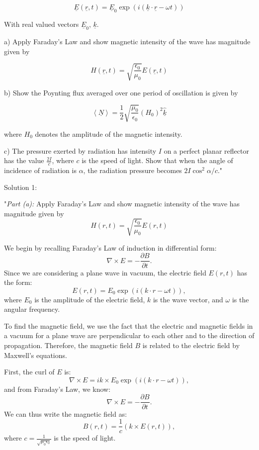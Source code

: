 \[ \underline{E}(\underline{r}, t) = \underline{E}_{0} \exp (i(\underline{k} \cdot \underline{r} - \omega t)) \]

With real valued vectors \( \underline{E}_{0} \), \( \underline{k} \).

a) Apply Faraday’s Law and show magnetic intensity of the wave has magnitude given by 

\[ H(\underline{r}, t) = \sqrt{\frac{\epsilon_{0}}{\mu_{0}}} E(\underline{r}, t) \]

b) Show the Poynting flux averaged over one period of oscillation is given by 

\[ \left< \underline{N} \right> = \frac{1}{2} \sqrt{\frac{\mu_{0}}{\epsilon_{0}}} (H_{0})^{2} \hat{\underline{k}} \]

where \( H_{0} \) denotes the amplitude of the magnetic intensity.
    
c) The pressure exerted by radiation has intensity \( I \) on a perfect planar reflector has the value \( \frac{2I}{c} \), where \( c \) is the speed of light. Show that when the angle of incidence of radiation is \( \alpha \), the radiation pressure becomes \( 2I\cos^{2}{\alpha}/{c} \)."

Solution 1:

"\textit{Part (a):} Apply Faraday’s Law and show magnetic intensity of the wave has magnitude given by
\[
H(r, t) = \sqrt{\frac{\epsilon_0}{\mu_0}} E(r, t)
\]

We begin by recalling Faraday’s Law of induction in differential form:
\[
\nabla \times E = - \frac{\partial B}{\partial t}.
\]
Since we are considering a plane wave in vacuum, the electric field \(E(r,t)\) has the form:
\[
E(r, t) = E_0 \exp(i(k \cdot r - \omega t)),
\]
where \(E_0\) is the amplitude of the electric field, \(k\) is the wave vector, and \(\omega\) is the angular frequency.

To find the magnetic field, we use the fact that the electric and magnetic fields in a vacuum for a plane wave are perpendicular to each other and to the direction of propagation. Therefore, the magnetic field \(B\) is related to the electric field by Maxwell's equations.

First, the curl of \(E\) is:
\[
\nabla \times E = i k \times E_0 \exp(i(k \cdot r - \omega t)),
\]
and from Faraday’s Law, we know:
\[
\nabla \times E = - \frac{\partial B}{\partial t}.
\]
We can thus write the magnetic field as:
\[
B(r, t) = \frac{1}{c} (k \times E(r, t)),
\]
where \(c = \frac{1}{\sqrt{\mu_0 \epsilon_0}}\) is the speed of light.

